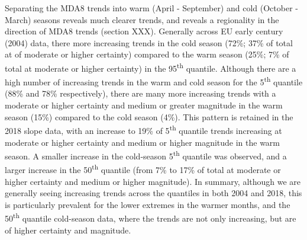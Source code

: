 \documentclass[journal abbreviation, manuscript]{copernicus}
\begin{document}

Separating the MDA8 trends into warm (April - September) and cold (October - March) seasons reveals much clearer trends, and reveals a regionality in the direction of MDA8 trends (section XXX). Generally across EU early century (2004) data, there more increasing trends in the cold season (72\%; 37\% of total at of moderate or higher certainty) compared to the warm season (25\%; 7\% of total at moderate or higher certainty) in the 95\textsuperscript{th} quantile. Although there are a high number of increasing trends in the warm and cold season for the 5\textsuperscript{th} quantile (88\% and 78\% respectively), there are many more increasing trends with a moderate or higher certainty and medium or greater magnitude in the warm season (15\%) compared to the cold season (4\%). This pattern is retained in the 2018 slope data, with an increase to 19\% of 5\textsuperscript{th} quantile trends increasing at moderate or higher certainty and medium or higher magnitude in the warm season. A smaller increase in the cold-season 5\textsuperscript{th} quantile was observed, and a larger increase in the 50\textsuperscript{th} quantile (from 7\% to 17\% of total at moderate or higher certainty and medium or higher magnitude). In summary, although we are generally seeing increasing trends across the quantiles in both 2004 and 2018, this is particularly prevalent for the lower extremes in the warmer months, and the 50\textsuperscript{th} quantile cold-season data, where the trends are not only increasing, but are of higher certainty and magnitude.
\end{document}
